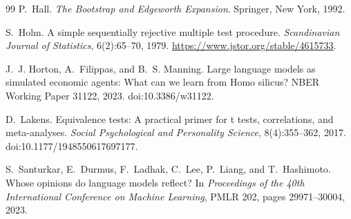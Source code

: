 \documentclass[11pt]{article}
\begin{document}
\begin{thebibliography}{99}
P.~Hall.
\newblock \emph{The Bootstrap and Edgeworth Expansion}.
\newblock Springer, New York, 1992.

S.~Holm.
\newblock A simple sequentially rejective multiple test procedure.
\newblock \emph{Scandinavian Journal of Statistics}, 6(2):65--70, 1979.
\newblock \url{https://www.jstor.org/stable/4615733}.

J.~J. Horton, A.~Filippas, and B.~S. Manning.
\newblock Large language models as simulated economic agents: What can we learn from {H}omo silicus?
\newblock NBER Working Paper 31122, 2023.
\newblock doi:10.3386/w31122.

D.~Lakens.
\newblock Equivalence tests: A practical primer for t tests, correlations, and meta-analyses.
\newblock \emph{Social Psychological and Personality Science}, 8(4):355--362, 2017.
\newblock doi:10.1177/1948550617697177.

S.~Santurkar, E.~Durmus, F.~Ladhak, C.~Lee, P.~Liang, and T.~Hashimoto.
\newblock Whose opinions do language models reflect?
\newblock In \emph{Proceedings of the 40th International Conference on Machine Learning}, PMLR 202, pages 29971--30004, 2023.

\end{thebibliography}
\end{document}
